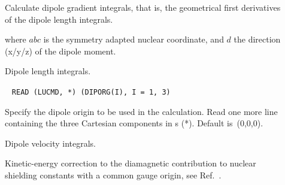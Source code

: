 \begin{description}
\item[]

Calculate dipole gradient integrals, that is, the geometrical first
derivatives of the dipole length integrals.

where $abc$ is the symmetry adapted nuclear coordinate, and $d$ the
direction (x/y/z) of the dipole moment.

\item[] Dipole length integrals.


\item[]\verb| |\newline
\verb|READ (LUCMD, *) (DIPORG(I), I = 1, 3)|

Specify the dipole origin to be used in the
calculation.
Read one more line containing the three Cartesian
components in \bohr{}s (*). Default is~(0,0,0).

\item[] Dipole velocity integrals.


\item[] Kinetic-energy correction to the diamagnetic
contribution to nuclear shielding constants with a common gauge
origin, see Ref.~\cite{pmpljvkrjcp119}.



\end{description}
